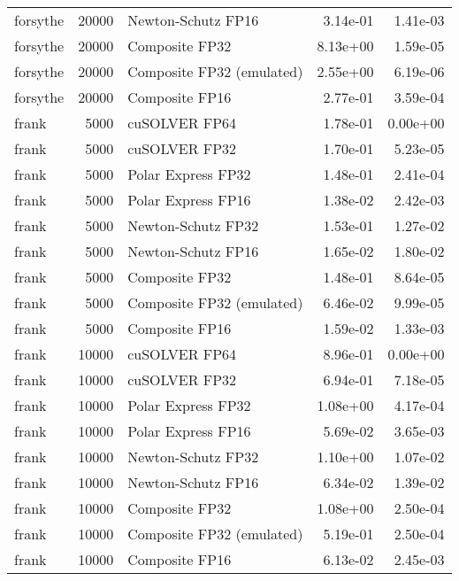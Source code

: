 \begin{table}
\begin{tabular}{lrlrr}
 forsythe & 20000 &        Newton-Schutz FP16 &  3.14e-01 &        1.41e-03 \\
 forsythe & 20000 &            Composite FP32 &  8.13e+00 &        1.59e-05 \\
 forsythe & 20000 & Composite FP32 (emulated) &  2.55e+00 &        6.19e-06 \\
 forsythe & 20000 &            Composite FP16 &  2.77e-01 &        3.59e-04 \\
    frank &  5000 &             cuSOLVER FP64 &  1.78e-01 &        0.00e+00 \\
    frank &  5000 &             cuSOLVER FP32 &  1.70e-01 &        5.23e-05 \\
    frank &  5000 &        Polar Express FP32 &  1.48e-01 &        2.41e-04 \\
    frank &  5000 &        Polar Express FP16 &  1.38e-02 &        2.42e-03 \\
    frank &  5000 &        Newton-Schutz FP32 &  1.53e-01 &        1.27e-02 \\
    frank &  5000 &        Newton-Schutz FP16 &  1.65e-02 &        1.80e-02 \\
    frank &  5000 &            Composite FP32 &  1.48e-01 &        8.64e-05 \\
    frank &  5000 & Composite FP32 (emulated) &  6.46e-02 &        9.99e-05 \\
    frank &  5000 &            Composite FP16 &  1.59e-02 &        1.33e-03 \\
    frank & 10000 &             cuSOLVER FP64 &  8.96e-01 &        0.00e+00 \\
    frank & 10000 &             cuSOLVER FP32 &  6.94e-01 &        7.18e-05 \\
    frank & 10000 &        Polar Express FP32 &  1.08e+00 &        4.17e-04 \\
    frank & 10000 &        Polar Express FP16 &  5.69e-02 &        3.65e-03 \\
    frank & 10000 &        Newton-Schutz FP32 &  1.10e+00 &        1.07e-02 \\
    frank & 10000 &        Newton-Schutz FP16 &  6.34e-02 &        1.39e-02 \\
    frank & 10000 &            Composite FP32 &  1.08e+00 &        2.50e-04 \\
    frank & 10000 & Composite FP32 (emulated) &  5.19e-01 &        2.50e-04 \\
    frank & 10000 &            Composite FP16 &  6.13e-02 &        2.45e-03 \\

\end{tabular}
\end{table}
